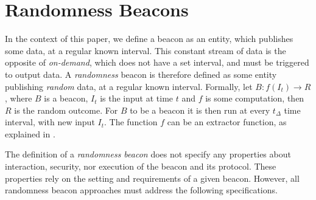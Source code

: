 \section{Randomness Beacons}
In the context of this paper, we define a beacon as an entity, which publishes some data, at a regular known interval.
This constant stream of data is the opposite of \emph{on-demand}, which does not have a set interval, and must be triggered to output data.
A \emph{randomness} beacon is therefore defined as some entity publishing \emph{random} data, at a regular known interval.
Formally, let $B: f(I_t) \rightarrow R$, where $B$ is a beacon, $I_t$ is the input at time $t$ and $f$ is some computation, then $R$ is the random outcome.
For $B$ to be a beacon it is then run at every $t_\Delta$ time interval, with new input $I_t$.
The function $f$ can be an extractor function, %
as explained in .

The definition of a \emph{randomness beacon} does not specify any properties about interaction, security, nor execution of the beacon and its protocol.
These properties rely on the setting and requirements of a given beacon.
However, all randomness beacon approaches must address the following specifications.


